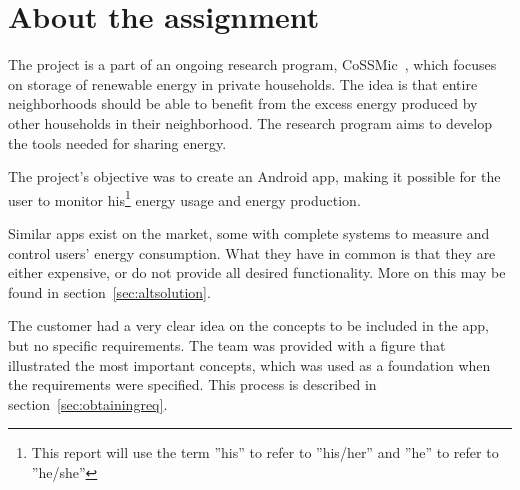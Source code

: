 \section{About the assignment}

The project is a part of an ongoing research program, CoSSMic~\cite{cossmic}, which focuses on storage of renewable energy in private households. 
The idea is that entire neighborhoods should be able to benefit from the excess energy produced by other households in their neighborhood. 
The research program aims to develop the tools needed for sharing energy. 

The project's objective was to create an Android \gls{app}, making it possible for the user to monitor his\footnote{This report will use the term ''his'' to refer to ''his/her'' and ''he'' to refer to ''he/she''} 
energy usage and energy production. 

Similar apps exist on the market, some with complete systems to measure and control users' energy consumption. 
What they have in common is that they are either expensive, or do not provide all desired functionality. More on this may be found in section~\ref{sec:altsolution}.

The customer had a very clear idea on the concepts to be included in the app, but no specific requirements. The team was provided with a figure that illustrated the most important concepts, which was used as a foundation when the requirements were specified. 
This process is described in section~\ref{sec:obtainingreq}.